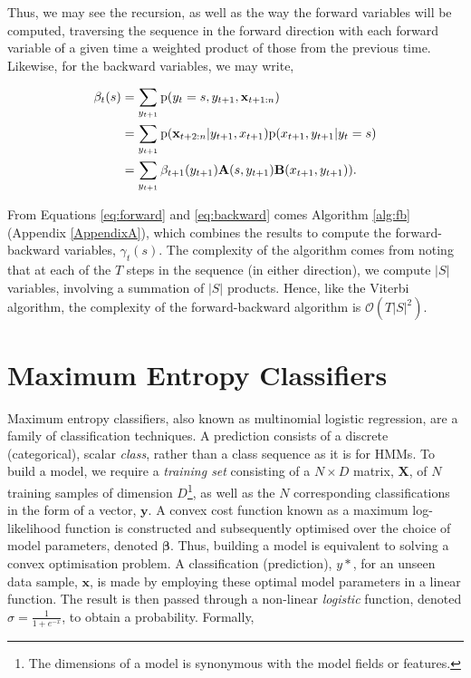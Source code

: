 Thus, we may see the recursion, as well as the way the forward variables will be computed, traversing the sequence in the forward direction with each forward variable of a given time a weighted product of those from the previous time. Likewise, for the backward variables, we may write,

\begin{equation}
\begin{aligned}
\beta_t(s) &= \sum_{y_{t+1}} \text{p}(y_t = s, y_{t+1}, \mathbf{x}_{t+1:n}) \\
& = \sum_{y_{t+1}} \text{p}(\mathbf{x}_{t+2:n}|y_{t+1}, x_{t+1}) \text{p}(x_{t+1}, y_{t+1}|y_t = s) \\
& = \sum_{y_{t+1}} \beta_{t+1}(y_{t+1}) \mathbf{A}(s, y_{t+1}) \mathbf{B}(x_{t+1}, y_{t+1})).
\end{aligned}
\label{eq:backward}
\end{equation}

From Equations \ref{eq:forward} and \ref{eq:backward} comes Algorithm \ref{alg:fb} (Appendix \ref{AppendixA}), which combines the results to compute the forward-backward variables, $\gamma_t(s)$. The complexity of the algorithm comes from noting that at each of the $T$ steps in the sequence (in either direction), we compute $|S|$ variables, involving a summation of $|S|$ products. Hence, like the Viterbi algorithm, the complexity of the forward-backward algorithm is $\mathcal{O}(T|S|^2)$.

\section{Maximum Entropy Classifiers}

Maximum entropy classifiers, also known as multinomial logistic regression, are a family of classification techniques. A prediction consists of a discrete (categorical), scalar \emph{class}, rather than a class sequence as it is for HMMs. To build a model, we require a \emph{training set} consisting of a $N \times D$ matrix, $\mathbf{X}$, of $N$ training samples of dimension $D$\footnote{The dimensions of a model is synonymous with the model fields or features.}, as well as the $N$ corresponding classifications in the form of a vector, $\mathbf{y}$. A convex cost function known as a maximum log-likelihood function is constructed and subsequently optimised over the choice of model parameters, denoted $\boldsymbol\beta$. Thus, building a model is equivalent to solving a convex optimisation problem. A classification (prediction), $y*$, for an unseen data sample, $\mathbf{x}$, is made by employing these optimal model parameters in a linear function. The result is then passed through a non-linear \emph{logistic} function, denoted $\sigma = \frac{1}{1 + e^{-x}}$, to obtain a probability. Formally,

